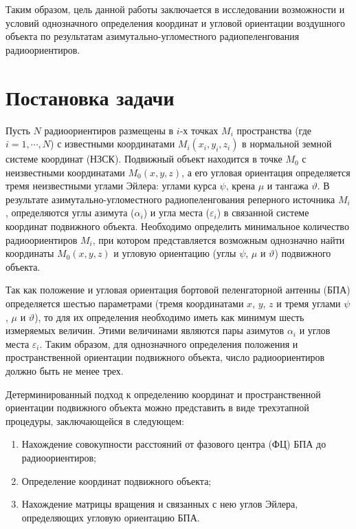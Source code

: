 \documentclass[a4paper,12pt]{article}
\begin{document}
Таким образом, цель данной работы заключается в исследовании возможности и условий однозначного определения
координат и угловой ориентации воздушного объекта по результатам азимутально-угломестного радиопеленгования
радиоориентиров.

\section{Постановка задачи}
Пусть $N$ радиоориентиров размещены в $i$-х точках $M_i$ пространства (где $i = 1, \cdots, N$) с известными
координатами $M_i\left(x_i, y_i, z_i\right)$ в нормальной земной системе координат (НЗСК). Подвижный объект
находится в точке $M_0$ с неизвестными координатами $M_0\left(x, y, z\right)$, а его угловая ориентация
определяется тремя неизвестными углами Эйлера: углами курса $\psi$, крена $\mu$ и тангажа $\vartheta$.
В результате азимутально-угломестного радиопеленгования реперного источника $M_i$, определяются углы
азимута ($\alpha_i$) и угла места ($\varepsilon_i$) в связанной системе координат подвижного объекта. Необходимо
определить минимальное количество радиоориентиров $M_i$, при котором представляется возможным однозначно найти
координаты $M_0\left(x, y, z\right)$ и угловую ориентацию (углы $\psi$, $\mu$ и $\vartheta$) подвижного
объекта.

Так как положение и угловая ориентация бортовой пеленгаторной антенны (БПА) определяется шестью параметрами
(тремя координатами $x$, $y$, $z$ и тремя углами $\psi$, $\mu$ и $\vartheta$), то для их определения необходимо
иметь как минимум шесть измеряемых величин. Этими величинами являются пары азимутов $\alpha_i$ и углов места
$\varepsilon_i$. Таким образом, для однозначного определения положения и пространственной ориентации подвижного
объекта, число радиоориентиров должно быть не менее трех.

Детерминированный подход к определению координат и пространственной ориентации подвижного объекта можно представить
в виде трехэтапной процедуры, заключающейся в следующем:
\begin{enumerate}
    \item Нахождение совокупности расстояний от фазового центра (ФЦ) БПА до радиоориентиров;
    \item Определение координат подвижного объекта;
    \item Нахождение матрицы вращения и связанных с нею углов Эйлера, определяющих угловую ориентацию БПА.
\end{enumerate}
\end{document}
